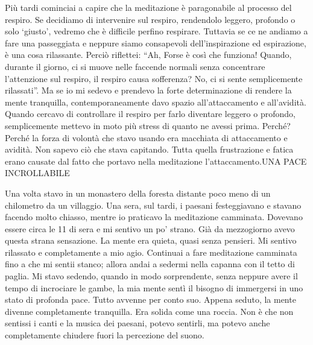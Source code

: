 Più tardi cominciai a capire che la meditazione è paragonabile al
processo del respiro. Se decidiamo di intervenire sul respiro,
rendendolo leggero, profondo o solo `giusto', vedremo che è difficile
perfino respirare. Tuttavia se ce ne andiamo a fare una passeggiata e
neppure siamo consapevoli dell'inspirazione ed espirazione, è una cosa
rilassante. Perciò riflettei: ``Ah, Forse è così che funziona! Quando,
durante il giorno, ci si muove nelle faccende normali senza concentrare
l'attenzione sul respiro, il respiro causa sofferenza? No, ci si sente
semplicemente rilassati''. Ma se io mi sedevo e prendevo la forte
determinazione di rendere la mente tranquilla, contemporaneamente davo
spazio all'attaccamento e all'avidità. Quando cercavo di controllare il
respiro per farlo diventare leggero o profondo, semplicemente mettevo in
moto più stress di quanto ne avessi prima. Perché? Perché la forza di
volontà che stavo usando era macchiata di attaccamento e avidità. Non
sapevo ciò che stava capitando. Tutta quella frustrazione e fatica erano
causate dal fatto che portavo nella meditazione l'attaccamento.UNA PACE
INCROLLABILE

Una volta stavo in un monastero della foresta distante poco meno di un
chilometro da un villaggio. Una sera, sul tardi, i paesani festeggiavano
e stavano facendo molto chiasso, mentre io praticavo la meditazione
camminata. Dovevano essere circa le 11 di sera e mi sentivo un po'
strano. Già da mezzogiorno avevo questa strana sensazione. La mente era
quieta, quasi senza pensieri. Mi sentivo rilassato e completamente a mio
agio. Continuai a fare meditazione camminata fino a che mi sentii
stanco; allora andai a sedermi nella capanna con il tetto di paglia. Mi
stavo sedendo, quando in modo sorprendente, senza neppure avere il tempo
di incrociare le gambe, la mia mente sentì il bisogno di immergersi in
uno stato di profonda pace. Tutto avvenne per conto suo. Appena seduto,
la mente divenne completamente tranquilla. Era solida come una roccia.
Non è che non sentissi i canti e la musica dei paesani, potevo sentirli,
ma potevo anche completamente chiudere fuori la percezione del suono.


